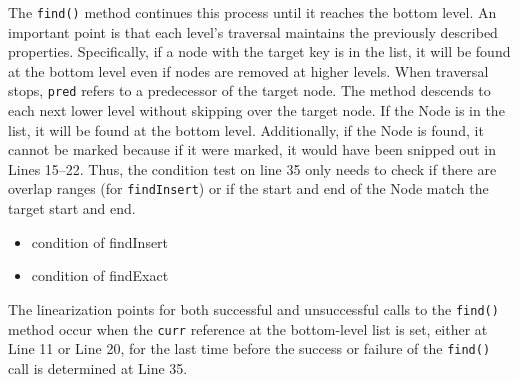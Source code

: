 The \texttt{find()} method continues this process until it reaches the bottom level.
An important point is that each level's traversal maintains the previously described properties.
Specifically, if a node with the target key is in the list, it will be found at the bottom level even if nodes are removed at higher levels.
When traversal stops, \texttt{pred} refers to a predecessor of the target node.
The method descends to each next lower level without skipping over the target node.
If the Node is in the list, it will be found at the bottom level.
Additionally, if the Node is found, it cannot be marked because if it were marked, it would have been snipped out in Lines 15--22.
Thus, the condition test on line 35 only needs to check if there are overlap ranges (for \texttt{findInsert}) or if the start and end of the Node match the target start and end.

\begin{itemize}
    \item condition of findInsert
    \item condition of findExact
\end{itemize}

The linearization points for both successful and unsuccessful calls to the \texttt{find()} method occur when the \texttt{curr} reference at the bottom-level list is set, either at Line 11 or Line 20, for the last time before the success or failure of the \texttt{find()} call is determined at Line 35.